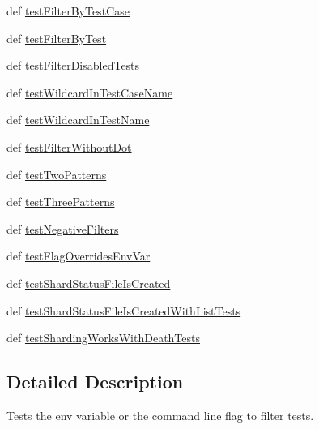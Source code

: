 \begin{DoxyCompactItemize}
def \hyperlink{classgtest__filter__unittest_1_1_g_test_filter_unit_test_ad8575d865bac828650d63a9d7ef9aa33}{test\-Filter\-By\-Test\-Case}
\item 
def \hyperlink{classgtest__filter__unittest_1_1_g_test_filter_unit_test_a52f8283fcb667fecc61bcf6b0c644110}{test\-Filter\-By\-Test}
\item 
def \hyperlink{classgtest__filter__unittest_1_1_g_test_filter_unit_test_ac3b073227ea44f0c8edfe71399e06ed2}{test\-Filter\-Disabled\-Tests}
\item 
def \hyperlink{classgtest__filter__unittest_1_1_g_test_filter_unit_test_a8ec7a5c1fd81e3d6e2ba01df0a89c19d}{test\-Wildcard\-In\-Test\-Case\-Name}
\item 
def \hyperlink{classgtest__filter__unittest_1_1_g_test_filter_unit_test_a3a5d790d7435a350e3c74dd7c03b52eb}{test\-Wildcard\-In\-Test\-Name}
\item 
def \hyperlink{classgtest__filter__unittest_1_1_g_test_filter_unit_test_acd3d9f6dcd21359438153d5624da97da}{test\-Filter\-Without\-Dot}
\item 
def \hyperlink{classgtest__filter__unittest_1_1_g_test_filter_unit_test_aa95a922748a6aabbe417e18d2ce71de5}{test\-Two\-Patterns}
\item 
def \hyperlink{classgtest__filter__unittest_1_1_g_test_filter_unit_test_a96b102cb72df77f4a6d63242ba7fc161}{test\-Three\-Patterns}
\item 
def \hyperlink{classgtest__filter__unittest_1_1_g_test_filter_unit_test_ab6864a7e18a17918e214f3c8ca56f8bf}{test\-Negative\-Filters}
\item 
def \hyperlink{classgtest__filter__unittest_1_1_g_test_filter_unit_test_ace45706e0822bf3ebd0029daa60cab1e}{test\-Flag\-Overrides\-Env\-Var}
\item 
def \hyperlink{classgtest__filter__unittest_1_1_g_test_filter_unit_test_a7632dd779e02d9f02793da52c5af1b75}{test\-Shard\-Status\-File\-Is\-Created}
\item 
def \hyperlink{classgtest__filter__unittest_1_1_g_test_filter_unit_test_a634e3c86d8dfa7e093b88ce9d9cc3fc5}{test\-Shard\-Status\-File\-Is\-Created\-With\-List\-Tests}
\item 
def \hyperlink{classgtest__filter__unittest_1_1_g_test_filter_unit_test_adbb40897d541ad4485b2f235a9d5af7e}{test\-Sharding\-Works\-With\-Death\-Tests}
\end{DoxyCompactItemize}


\subsection{Detailed Description}
\begin{DoxyVerb}Tests the env variable or the command line flag to filter tests.\end{DoxyVerb}
 

